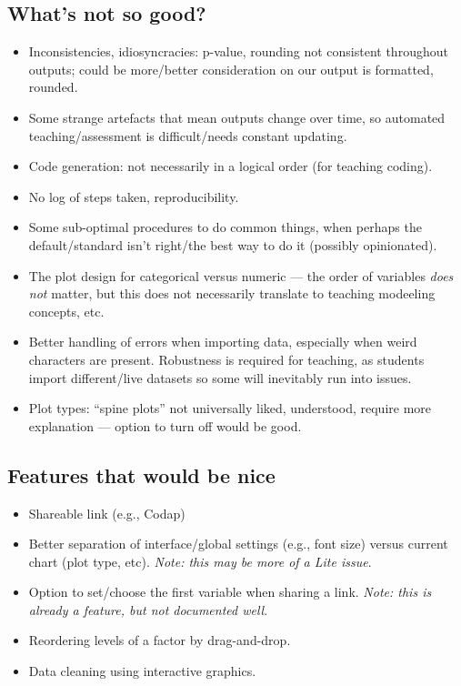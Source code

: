 \documentclass{article}
\begin{document}
\subsection{What's not so good?}

\begin{itemize}
    \item Inconsistencies, idiosyncracies: p-value, rounding not consistent throughout outputs; could be more/better consideration on our output is formatted, rounded.
    \item Some strange artefacts that mean outputs change over time, so automated teaching/assessment is difficult/needs constant updating.
    \item Code generation: not necessarily in a logical order (for teaching coding).
    \item No log of steps taken, reproducibility.
    \item Some sub-optimal procedures to do common things, when perhaps the default/standard isn't right/the best way to do it (possibly opinionated).
    \item The plot design for categorical versus numeric --- the order of variables \emph{does not} matter, but this does not necessarily translate to teaching modeeling concepts, etc.
    \item Better handling of errors when importing data, especially when weird characters are present. Robustness is required for teaching, as students import different/live datasets so some will inevitably run into issues.
    \item Plot types: ``spine plots'' not universally liked, understood, require more explanation --- option to turn off would be good.
\end{itemize}

\subsection{Features that would be nice}

\begin{itemize}
    \item Shareable link (e.g., Codap)
    \item Better separation of interface/global settings (e.g., font size) versus current chart (plot type, etc). \emph{Note: this may be more of a Lite issue}.
    \item Option to set/choose the first variable when sharing a link. \emph{Note: this is already a feature, but not documented well}.
    \item Reordering levels of a factor by drag-and-drop.
    \item Data cleaning using interactive graphics.
\end{itemize}
\end{document}
